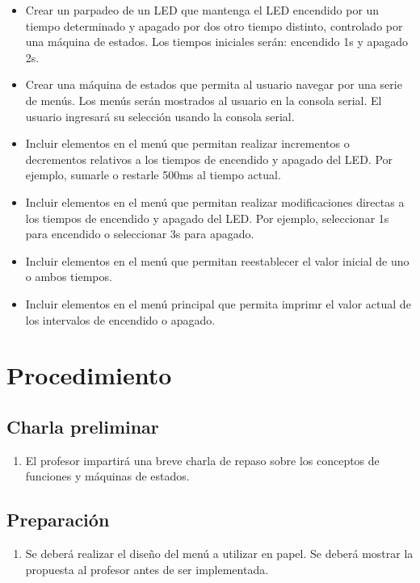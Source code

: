 \documentclass[12pt,letterpaper]{IEEEtran}
\begin{document}
\begin{itemize}
	\item Crear un parpadeo de un LED que mantenga el LED encendido por un tiempo determinado y apagado por dos otro tiempo distinto, controlado por una máquina de estados. Los tiempos iniciales serán: encendido 1s y apagado 2s.
	\item Crear una máquina de estados que permita al usuario navegar por una serie de menús. Los menús serán mostrados al usuario en la consola serial. El usuario ingresará su selección usando la consola serial.
	\item Incluir elementos en el menú que permitan realizar incrementos o decrementos relativos a los tiempos de encendido y apagado del LED. Por ejemplo, sumarle o restarle 500ms al tiempo actual.
	\item Incluir elementos en el menú que permitan realizar modificaciones directas a los tiempos de encendido y apagado del LED. Por ejemplo, seleccionar 1s para encendido o seleccionar 3s para apagado.
	\item Incluir elementos en el menú que permitan reestablecer el valor inicial de uno o ambos tiempos.
	\item Incluir elementos en el menú principal que permita imprimr el valor actual de los intervalos de encendido o apagado.
\end{itemize}

\section{Procedimiento}

\subsection{Charla preliminar}

\begin{enumerate}
	\item El profesor impartirá una breve charla de repaso sobre los conceptos de funciones y máquinas de estados.
\end{enumerate}


\subsection{Preparación}

\begin{enumerate}[resume]
	\item Se deberá realizar el diseño del menú a utilizar en papel. Se deberá mostrar la propuesta al profesor antes de ser implementada.
\end{enumerate}
\end{document}
